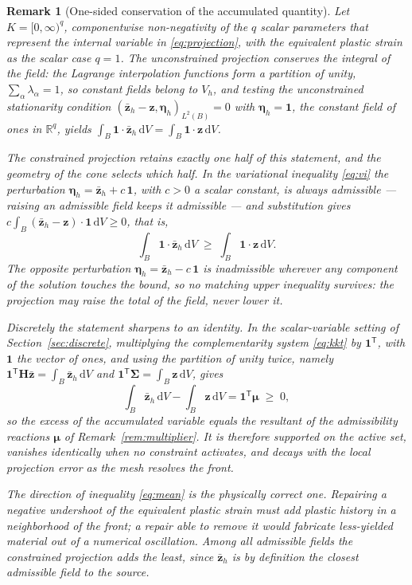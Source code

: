 \documentclass[11pt]{article}
\newcommand{\dd}{\mathrm{d}}
\newcommand{\inner}[2]{\left( #1 , #2 \right)}
\newcommand{\bs}[1]{\boldsymbol{#1}}
\newtheorem{remark}{Remark}
\begin{document}
\begin{remark}[One-sided conservation of the accumulated quantity]
\label{rem:mean}
Let $K = [0,\infty)^q$, componentwise non-negativity of the $q$ scalar
parameters that represent the internal variable in
\eqref{eq:projection}, with the equivalent plastic strain as the scalar
case $q = 1$. The \emph{unconstrained} projection conserves the integral
of the field: the Lagrange interpolation functions form a partition of
unity, $\sum_\alpha \lambda_\alpha = 1$, so constant fields belong to
$V_h$, and testing the unconstrained stationarity condition
$\inner{\bar{\bs{z}}_h - \bs{z}}{\bs{\eta}_h}_{L^2(B)} = 0$ with
$\bs{\eta}_h = \bs{1}$, the constant field of ones in $\mathbb{R}^q$,
yields
$\int_B \bs{1} \cdot \bar{\bs{z}}_h \,\dd V =
\int_B \bs{1} \cdot \bs{z} \,\dd V$.

The constrained projection retains exactly one half of this statement,
and the geometry of the cone selects which half. In the variational
inequality \eqref{eq:vi} the perturbation
$\bs{\eta}_h = \bar{\bs{z}}_h + c\,\bs{1}$, with $c > 0$ a scalar
constant, is always admissible --- raising an admissible field keeps it
admissible --- and substitution gives
$c \int_B (\bar{\bs{z}}_h - \bs{z}) \cdot \bs{1} \,\dd V \geq 0$,
that is,
\begin{equation}
\int_B \bs{1} \cdot \bar{\bs{z}}_h \,\dd V \;\geq\;
\int_B \bs{1} \cdot \bs{z} \,\dd V .
\label{eq:mean}
\end{equation}
The opposite perturbation $\bs{\eta}_h = \bar{\bs{z}}_h - c\,\bs{1}$
is inadmissible wherever any component of the solution touches the
bound, so no matching upper inequality survives: the projection may
raise the total of the field, never lower it.

Discretely the statement sharpens to an identity. In the
scalar-variable setting of Section~\ref{sec:discrete}, multiplying the
complementarity system \eqref{eq:kkt} by $\bs{1}^{\mathsf{T}}$, with
$\bs{1}$ the vector of ones, and using the partition of unity twice,
namely
$\bs{1}^{\mathsf{T}} \bs{H} \bar{\bs{z}} = \int_B \bar{\bs{z}}_h \,\dd V$
and $\bs{1}^{\mathsf{T}} \bs{\Sigma} = \int_B \bs{z} \,\dd V$, gives
\begin{equation}
\int_B \bar{\bs{z}}_h \,\dd V - \int_B \bs{z} \,\dd V
= \bs{1}^{\mathsf{T}} \bs{\mu} \;\geq\; 0 ,
\label{eq:meanid}
\end{equation}
so the excess of the accumulated variable equals the resultant of the
admissibility reactions $\bs{\mu}$ of
Remark~\ref{rem:multiplier}. It is therefore supported on the active
set, vanishes identically when no constraint activates, and decays with
the local projection error as the mesh resolves the front.

The direction of inequality \eqref{eq:mean} is the physically correct
one. Repairing a negative undershoot of the equivalent plastic strain
must add plastic history in a neighborhood of the front; a repair able
to remove it would fabricate less-yielded material out of a numerical
oscillation. Among all admissible fields the constrained projection adds
the least, since $\bar{\bs{z}}_h$ is by definition the closest
admissible field to the source.
\end{remark}
\end{document}
